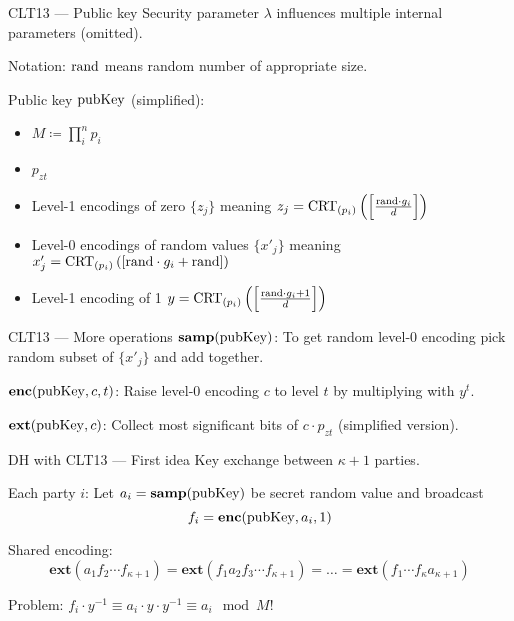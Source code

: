 \documentclass[english]{beamer}
\begin{document}
    \begin{frame}{CLT13 --- Public key}
        Security parameter $\lambda$ influences multiple internal parameters (omitted).

        Notation: $\mathrm{rand}$ means random number of appropriate size.

        Public key $\mathrm{pubKey}$ (simplified):
        \begin{itemize}
            \item $M \coloneqq \prod_i^n p_i$
            \item $p_{zt}$
            \item Level-1 encodings of zero $\{z_j\}$ meaning $z_j = \operatorname{CRT}_{(p_{i})}\left(\left[\frac{\mathrm{rand} \cdot g_i}{d}\right]\right)$
            \item Level-0 encodings of random values $\{x'_j\}$ meaning $x'_j = \operatorname{CRT}_{(p_{i})}\left(\left[\mathrm{rand} \cdot g_i + \mathrm{rand}\right]\right)$
            \item Level-1 encoding of 1 $y = \operatorname{CRT}_{(p_{i})}\left(\left[\frac{\mathrm{rand} \cdot g_i + 1}{d}\right]\right)$
        \end{itemize}
    \end{frame}
    \begin{frame}{CLT13 --- More operations}
        $\mathbf{samp}(\mathrm{pubKey})$: To get random level-0 encoding pick random subset of $\{x'_j\}$ and add together.
        \pause

        $\mathbf{enc}(\mathrm{pubKey}, c, t)$: Raise level-0 encoding $c$ to level $t$ by multiplying with $y^t$.
        \pause

        $\mathbf{ext}(\mathrm{pubKey}, c)$: Collect most significant bits of $c \cdot p_{zt}$ (simplified version).
    \end{frame}
    \begin{frame}{DH with CLT13 --- First idea}
        Key exchange between $\kappa + 1$ parties.

        Each party $i$: Let $a_i = \mathbf{samp}(\mathrm{pubKey})$ be secret random value and broadcast
        \begin{equation*}
            f_i = \mathbf{enc}(\mathrm{pubKey}, a_i, 1)
        \end{equation*}

        Shared encoding:
        \begin{equation*}
            \mathbf{ext}(a_1 f_2 \cdots f_{\kappa+1}) = \mathbf{ext}(f_1 a_2 f_3 \cdots f_{\kappa+1}) = \dots = \mathbf{ext}(f_1 \cdots f_{\kappa} a_{\kappa + 1})
        \end{equation*}
        \pause

        Problem: $f_i \cdot y^{-1} \equiv a_i \cdot y \cdot y^{-1} \equiv a_i \mod M$!
    \end{frame}
\end{document}
